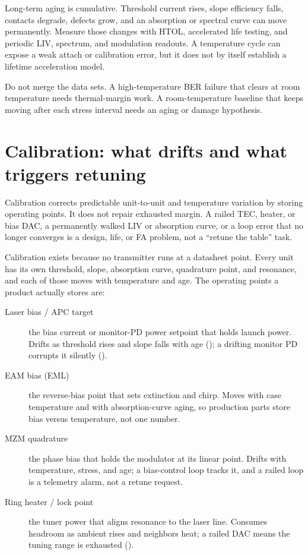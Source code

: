 Long-term aging is cumulative. Threshold current rises, slope efficiency falls,
contacts degrade, defects grow, and an absorption or spectral curve can move
permanently. Measure those changes with HTOL, accelerated life testing, and
periodic LIV, spectrum, and modulation readouts. A temperature cycle can expose a
weak attach or calibration error, but it does not by itself establish a lifetime
acceleration model.

Do not merge the data sets. A high-temperature BER failure that clears at room
temperature needs thermal-margin work. A room-temperature baseline that keeps
moving after each stress interval needs an aging or damage hypothesis.

\section{Calibration: what drifts and what triggers retuning}
\label{sec:laser-calibration}

Calibration corrects predictable unit-to-unit and temperature variation by
storing operating points. It does not repair exhausted margin. A railed TEC,
heater, or bias DAC, a permanently walked LIV or absorption curve, or a loop
error that no longer converges is a design, life, or FA problem, not a
``retune the table'' task.

Calibration exists because no transmitter runs at a datasheet point. Every unit
has its own threshold, slope, absorption curve, quadrature point, and resonance,
and each of those moves with temperature and age. The operating points a product
actually stores are:

\begin{description}
\item[Laser bias / APC target] the bias current or monitor-PD power setpoint
      that holds launch power. Drifts as threshold rises and slope falls with
      age (); a drifting monitor PD corrupts it silently
      ().
\item[EAM bias (EML)] the reverse-bias point that sets extinction and chirp.
      Moves with case temperature and with absorption-curve aging, so production
      parts store bias versus temperature, not one number.
\item[MZM quadrature] the phase bias that holds the modulator at its linear
      point. Drifts with temperature, stress, and age; a bias-control loop tracks
      it, and a railed loop is a telemetry alarm, not a retune request.
\item[Ring heater / lock point] the tuner power that aligns resonance to the
      laser line. Consumes headroom as ambient rises and neighbors heat; a railed
      DAC means the tuning range is exhausted
      ().
\end{description}

